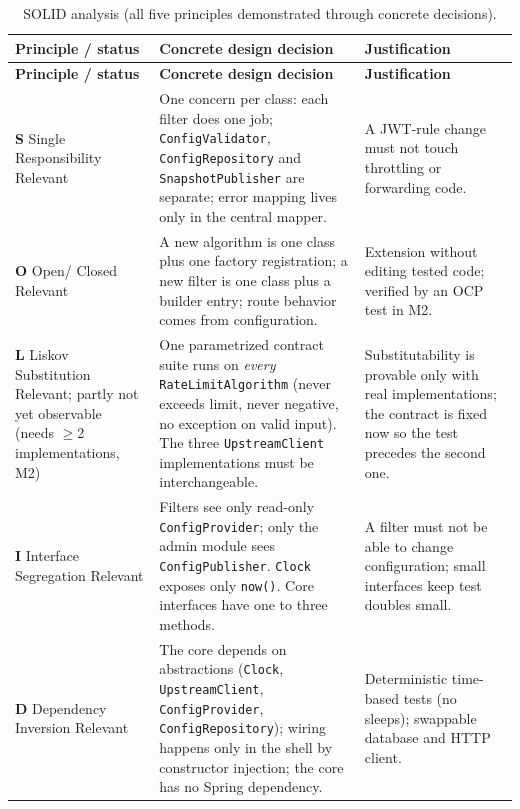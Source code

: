 \documentclass[12pt,a4paper]{article}
\newcommand{\cls}[1]{\nolinkurl{#1}}
\begin{document}
\begingroup
\small
\setlength{\tabcolsep}{4pt}
\begin{longtable}{L{2.9cm} L{6.6cm} L{4.3cm}}
\caption{SOLID analysis (all five principles demonstrated through concrete decisions).}\\
\toprule
\textbf{Principle / status} & \textbf{Concrete design decision} & \textbf{Justification} \\
\midrule
\endfirsthead
\toprule
\textbf{Principle / status} & \textbf{Concrete design decision} & \textbf{Justification} \\
\midrule
\endhead
\textbf{S} Single Responsibility \newline Relevant & One concern per class: each filter does one job; \cls{ConfigValidator}, \cls{ConfigRepository} and \cls{SnapshotPublisher} are separate; error mapping lives only in the central mapper. & A JWT-rule change must not touch throttling or forwarding code. \\
\textbf{O} Open/ Closed \newline Relevant & A new algorithm is one class plus one factory registration; a new filter is one class plus a builder entry; route behavior comes from configuration. & Extension without editing tested code; verified by an OCP test in M2. \\
\textbf{L} Liskov Substitution \newline Relevant; partly not yet observable (needs $\geq$2 implementations, M2) & One parametrized contract suite runs on \emph{every} \cls{RateLimitAlgorithm} (never exceeds limit, never negative, no exception on valid input). The three \cls{UpstreamClient} implementations must be interchangeable. & Substitutability is provable only with real implementations; the contract is fixed now so the test precedes the second one. \\
\textbf{I} Interface Segregation \newline Relevant & Filters see only read-only \cls{ConfigProvider}; only the admin module sees \cls{ConfigPublisher}. \cls{Clock} exposes only \cls{now()}. Core interfaces have one to three methods. & A filter must not be able to change configuration; small interfaces keep test doubles small. \\
\textbf{D} Dependency Inversion \newline Relevant & The core depends on abstractions (\cls{Clock}, \cls{UpstreamClient}, \cls{ConfigProvider}, \cls{ConfigRepository}); wiring happens only in the shell by constructor injection; the core has no Spring dependency. & Deterministic time-based tests (no sleeps); swappable database and HTTP client. \\
\bottomrule
\end{longtable}
\endgroup
\end{document}
